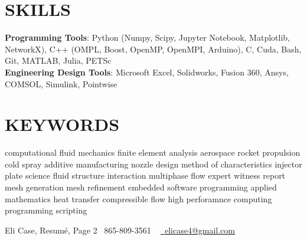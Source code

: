 \documentclass[letterpaper,11pt]{article}
\begin{document}
\section{SKILLS}
 \begin{itemize}[leftmargin=0.15in, label={}]
    \small{\item{
     \textbf{Programming Tools}{: Python (Numpy, Scipy, Jupyter Notebook, Matplotlib, NetworkX), C++ (OMPL, Boost, OpenMP, OpenMPI, Arduino), C, Cuda, Bash, Git, MATLAB, Julia, PETSc} \\
     \textbf{Engineering Design Tools}{: Microsoft Excel, Solidworks, Fusion 360, Ansys, COMSOL, Simulink, Pointwise} \\
    }}
 \end{itemize}
 \vspace{-16pt}

\section{KEYWORDS}
   \footnotesize{computational fluid mechanics finite element analysis aerospace rocket propulsion cold spray additive manufacturing nozzle design method of characteristics injector plate science fluid structure interaction multiphase flow expert witness report mesh generation mesh refinement embedded software programming applied mathematics heat transfer compressible flow high perforamnce computing programming scripting}

\vfill

Eli Case, Resum\'e, Page 2 \hfill \small \raisebox{-0.1\height}\faPhone\ 865-809-3561 ~ \hfill \href{mailto:elicase4@gmail.com}{\raisebox{-0.2\height}\faEnvelope\  \underline{elicase4@gmail.com}} ~ 
\end{document}
